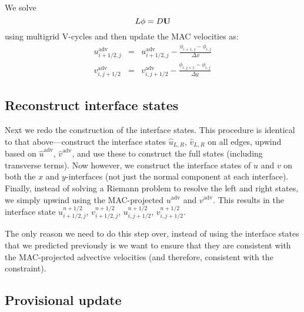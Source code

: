 We solve
\begin{equation}
L\phi = D{\bf U}
\end{equation}
using multigrid V-cycles and then update the MAC velocities as:
\begin{eqnarray}
u^\mathrm{adv}_{i+1/2,j} &=& u^\mathrm{adv}_{i+1/2,j} - 
    \frac{\phi_{i+1,j} - \phi_{i,j}}{\Delta x} \\
%
v^\mathrm{adv}_{i,j+1/2} &=& v^\mathrm{adv}_{i,j+1/2} - 
    \frac{\phi_{i,j+1} - \phi_{i,j}}{\Delta y}
\end{eqnarray}


\subsection{Reconstruct interface states}

Next we redo the construction of the interface states.  This procedure
is identical to that above---construct the interface states
$\hat{u}_{L,R}$, $\hat{v}_{L,R}$ on all edges, upwind based on
$\hat{u}^\mathrm{adv}$, $\hat{v}^\mathrm{adv}$, and use these to
construct the full states (including transverse terms).  Now however,
we construct the interface states of $u$ and $v$ on both the $x$ and
$y$-interfaces (not just the normal component at each interface).
Finally, instead of solving a Riemann problem to resolve the left and
right states, we simply upwind using the MAC-projected
$u^\mathrm{adv}$ and $v^\mathrm{adv}$.  This results in the interface
state $u^{n+1/2}_{i+1/2,j}$, $v^{n+1/2}_{i+1/2,j}$, $u^{n+1/2}_{i,j+1/2}$,
$v^{n+1/2}_{i,j+1/2}$.

The only reason we need to do this step over, instead of using the
interface states that we predicted previously is we want to ensure
that they are consistent with the MAC-projected advective velocities
(and therefore, consistent with the constraint).

\subsection{Provisional update}


